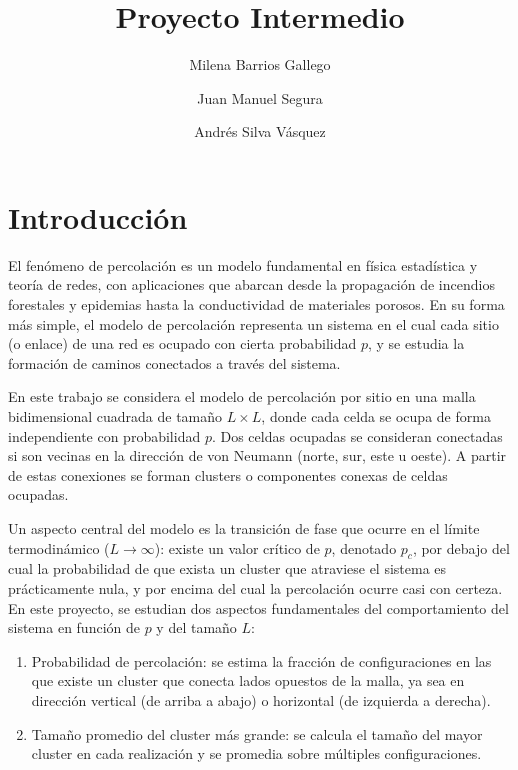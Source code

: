 \documentclass[12pt,a4paper,twoside]{tau-book}
\title{Proyecto Intermedio}
\author[1]{\large Milena Barrios Gallego}
\author[2]{\large Juan Manuel Segura}
\author[3]{\large Andrés Silva Vásquez}
\affil[1]{\normalsize Departamento de Física, Universidad Nacional de Colombia}
\begin{document}
	
    \maketitle
    \abscontent
    \thispagestyle{firststyle}


\section{Introducción}

El fenómeno de percolación es un modelo fundamental en física estadística y teoría de redes, con aplicaciones que abarcan desde la propagación de incendios forestales y epidemias hasta la conductividad de materiales porosos. En su forma más simple, el modelo de percolación representa un sistema en el cual cada sitio (o enlace) de una red es ocupado con cierta probabilidad $p$, y se estudia la formación de caminos conectados a través del sistema.

En este trabajo se considera el modelo de percolación por sitio en una malla bidimensional cuadrada de tamaño $L \times L$, donde cada celda se ocupa de forma independiente con probabilidad $p$. Dos celdas ocupadas se consideran conectadas si son vecinas en la dirección de von Neumann (norte, sur, este u oeste). A partir de estas conexiones se forman clusters o componentes conexas de celdas ocupadas.

Un aspecto central del modelo es la transición de fase que ocurre en el límite termodinámico ($L \to \infty$): existe un valor crítico de $p$, denotado $p_c$, por debajo del cual la probabilidad de que exista un cluster que atraviese el sistema es prácticamente nula, y por encima del cual la percolación ocurre casi con certeza. En este proyecto, se estudian dos aspectos fundamentales del comportamiento del sistema en función de $p$ y del tamaño $L$:

\begin{enumerate}
    \item Probabilidad de percolación: se estima la fracción de configuraciones en las que existe un cluster que conecta lados opuestos de la malla, ya sea en dirección vertical (de arriba a abajo) o horizontal (de izquierda a derecha).
    \item Tamaño promedio del cluster más grande: se calcula el tamaño del mayor cluster en cada realización y se promedia sobre múltiples configuraciones.
\end{enumerate}
\end{document}
